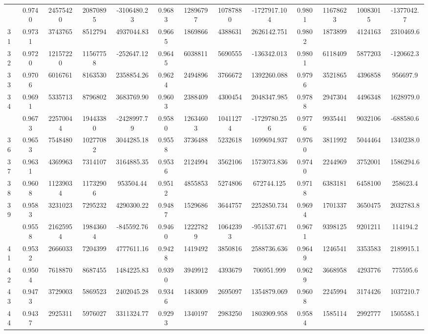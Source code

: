 \documentclass[
  12pt,
]{article}
\begin{document}
\begin{longtable}[t]{lcccccccccccc}
\addlinespace
30 & 0.9740 & 24575420 & 20870895 & -3106480.23 & 0.9683 & 12896797 & 10787880 & -1727917.104 & 0.9801 & 11678623 & 10083015 & -1377042.7\\
31 & 0.9731 & 3743765 & 8512794 & 4937044.83 & 0.9665 & 1869866 & 4388631 & 2626142.751 & 0.9802 & 1873899 & 4124163 & 2310469.6\\
32 & 0.9720 & 12157220 & 11567758 & -252647.12 & 0.9645 & 6038811 & 5690555 & -136342.013 & 0.9801 & 6118409 & 5877203 & -120662.3\\
33 & 0.9706 & 6016761 & 8163530 & 2358854.26 & 0.9624 & 2494896 & 3766672 & 1392260.088 & 0.9796 & 3521865 & 4396858 & 956697.9\\
34 & 0.9691 & 5335713 & 8796802 & 3683769.90 & 0.9603 & 2388409 & 4300454 & 2048347.985 & 0.9788 & 2947304 & 4496348 & 1628979.0\\
\addlinespace
35 & 0.9673 & 22570044 & 19443380 & -2428997.79 & 0.9580 & 12634603 & 10411274 & -1729780.256 & 0.9776 & 9935441 & 9032106 & -688580.6\\
36 & 0.9653 & 7548480 & 10277082 & 3044285.18 & 0.9558 & 3736488 & 5232618 & 1699694.937 & 0.9760 & 3811992 & 5044464 & 1340238.0\\
37 & 0.9631 & 4369963 & 7314107 & 3164885.35 & 0.9536 & 2124994 & 3562106 & 1573073.836 & 0.9740 & 2244969 & 3752001 & 1586294.6\\
38 & 0.9608 & 11239034 & 11732906 & 953504.44 & 0.9512 & 4855853 & 5274806 & 672744.125 & 0.9718 & 6383181 & 6458100 & 258623.4\\
39 & 0.9583 & 3231023 & 7295232 & 4290300.22 & 0.9487 & 1529686 & 3644757 & 2252850.734 & 0.9694 & 1701337 & 3650475 & 2032783.8\\
\addlinespace
40 & 0.9558 & 21625954 & 19843604 & -845592.76 & 0.9460 & 12227829 & 10642393 & -951537.671 & 0.9671 & 9398125 & 9201211 & 114194.2\\
41 & 0.9532 & 2666033 & 7204399 & 4777611.16 & 0.9428 & 1419492 & 3850816 & 2588736.636 & 0.9649 & 1246541 & 3353583 & 2189915.1\\
42 & 0.9504 & 7618870 & 8687455 & 1484225.83 & 0.9390 & 3949912 & 4393679 & 706951.999 & 0.9629 & 3668958 & 4293776 & 775595.6\\
43 & 0.9473 & 3729003 & 5869523 & 2402045.28 & 0.9346 & 1483009 & 2695097 & 1354879.069 & 0.9608 & 2245994 & 3174426 & 1037210.7\\
44 & 0.9437 & 2925311 & 5976027 & 3311324.77 & 0.9293 & 1340197 & 2983250 & 1803909.958 & 0.9584 & 1585114 & 2992777 & 1505585.1\\

\end{longtable}
\end{document}
